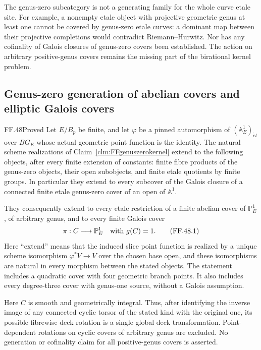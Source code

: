 The genus-zero subcategory is not a generating family
for the whole curve etale site. For example, a nonempty
etale object with projective geometric genus at least
one cannot be covered by genus-zero etale curves: a
dominant map between their projective completions would
contradict Riemann--Hurwitz. Nor has any cofinality of
Galois closures of genus-zero covers been established.
The action on arbitrary positive-genus covers remains the missing
part of the birational kernel problem.


\subsection{Genus-zero generation of abelian covers and elliptic Galois covers}

\begin{claim}{FF.48}{Proved}\label{clm:FFlatteskernel}
Let \(E/B_p\) be finite, and let \(\varphi\) be a pinned
automorphism of \((\mathbb A^1_E)_{\acute et}\) over \(BG_E\)
whose actual geometric point function is the identity.
The natural scheme realizations of
Claim~\ref{clm:FFgenuszerokernel} extend to the following
objects, after every finite extension of constants:
finite fibre products of the genus-zero objects, their
open subobjects, and finite etale quotients by finite
groups. In particular they extend to every subcover of
the Galois closure of a connected finite etale
genus-zero cover of an open of \(\mathbb A^1\).

They consequently extend to every etale restriction of
a finite abelian cover of \(\mathbb P^1_E\), of
arbitrary genus, and to every finite Galois cover
\[
                  \pi:C\longrightarrow\mathbb P^1_E
       \quad\hbox{with }g(C)=1.
                                                        \tag{FF.48.1}
\]
Here ``extend'' means that the induced slice point
function is realized by a unique scheme isomorphism
\(\varphi^*V\to V\) over the chosen base open, and
these isomorphisms are natural in every morphism between
the stated objects. The statement includes a quadratic
cover with four geometric branch points. It also
includes every degree-three cover with genus-one
source, without a Galois assumption.

Here \(C\) is smooth and geometrically integral.
Thus, after identifying the inverse image of any
connected cyclic torsor of the stated kind with the
original one, its possible fibrewise deck rotation is
a single global deck transformation. Point-dependent
rotations on cyclic covers of arbitrary genus are
excluded. No generation or cofinality
claim for all positive-genus covers is asserted.
\end{claim}

